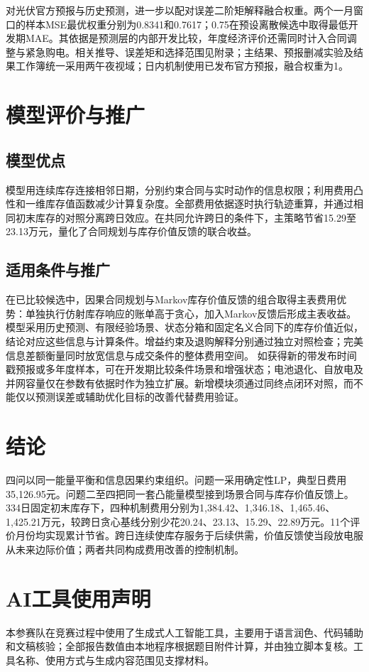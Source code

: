\documentclass[UTF8,a4paper,zihao=-4,fontset=mac]{ctexart}
\begin{document}
对光伏官方预报与历史预测，进一步以配对误差二阶矩解释融合权重。两个一月窗口的样本MSE最优权重分别为0.8341和0.7617；0.75在预设离散候选中取得最低开发期MAE。其依据是预测层的内部开发比较，年度经济评价还需同时计入合同调整与紧急购电。相关推导、误差矩和选择范围见附录；主结果、预报删减实验及结果工作簿统一采用两午夜视域；日内机制使用已发布官方预报，融合权重为1。

\section{模型评价与推广}
\subsection{模型优点}
模型用连续库存连接相邻日期，分别约束合同与实时动作的信息权限；利用费用凸性和一维库存值函数减少计算复杂度。全部费用依据逐时执行轨迹重算，并通过相同初末库存的对照分离跨日效应。在共同允许跨日的条件下，主策略节省15.29至23.13万元，量化了合同规划与库存价值反馈的联合收益。
\subsection{适用条件与推广}
在已比较候选中，因果合同规划与Markov库存价值反馈的组合取得主表费用优势：单独执行仿射库存响应的账单高于贪心，加入Markov反馈后形成主表收益。模型采用历史预测、有限经验场景、状态分箱和固定名义合同下的库存价值近似，结论对应这些信息与计算条件。增益约束及退购解释分别通过独立对照检查；完美信息差额衡量同时放宽信息与成交条件的整体费用空间。
如获得新的带发布时间戳预报或多年度样本，可在开发期比较条件场景和增强状态；电池退化、自放电及并网容量仅在参数有依据时作为独立扩展。新增模块须通过同终点闭环对照，而不能仅以预测误差或辅助优化目标的改善代替费用验证。
\section{结论}
四问以同一能量平衡和信息因果约束组织。问题一采用确定性LP，典型日费用35,126.95元。问题二至四把同一套凸能量模型接到场景合同与库存价值反馈上。334日固定初末库存下，四种机制费用分别为1,384.42、1,346.18、1,465.46、1,425.21万元，较跨日贪心基线分别少花20.24、23.13、15.29、22.89万元。11个评价月份均实现累计节省。跨日连续使库存服务于后续供需，价值反馈使当段放电服从未来边际价值；两者共同构成费用改善的控制机制。

\section*{AI工具使用声明}
本参赛队在竞赛过程中使用了生成式人工智能工具，主要用于语言润色、代码辅助和文稿核验；全部报告数值由本地程序根据题目附件计算，并由独立脚本复核。工具名称、使用方式与生成内容范围见支撑材料。
\end{document}
